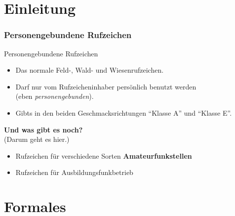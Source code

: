 

\subtitle{Betriebstechnik/Vorschriften 08: \\
  Amateurfunkstellen \\[2em]}
\date{Stand 07.11.2017}


\section[]{Einleitung}

\begin{frame}

    \frametitle{Personengebundene Rufzeichen}

    {\Large Personengebundene Rufzeichen}\\[1.5em]

    \begin{itemize}
        \item Das normale Feld-, Wald- und Wiesenrufzeichen.
        \item Darf nur vom Rufzeicheninhaber persönlich benutzt werden\\
          (eben \emph{personengebunden}).
        \item Gibts in den beiden Geschmacksrichtungen ``Klasse A'' und ``Klasse E''.
    \end{itemize}

    \begin{center}
        \Large{\textbf{Und was gibt es noch?}}\\(Darum geht es hier.)\\[1em]
    \end{center}
    
    \begin{itemize}
        \item Rufzeichen für verschiedene Sorten \textbf{Amateurfunkstellen}
        \item Rufzeichen für Ausbildungsfunkbetrieb
    \end{itemize}

\end{frame}

\section[]{Formales}


